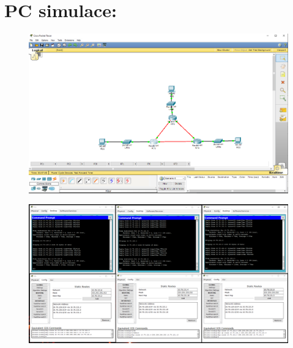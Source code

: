\documentclass[10pt, a4paper]{article}%
\begin{document}
\clearpage
\section*{PC simulace:}
\begin{figure}[ht!]
    \centering
    \includegraphics[width = 1\textwidth]{CISCO_diag.PNG}
\end{figure}	

\begin{figure}[ht!]
    \centering
    \includegraphics[width = 1\textwidth]{CISCO_config.PNG}
\end{figure}	

\clearpage
\end{document}
